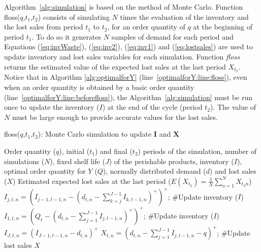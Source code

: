 Algorithm~\ref{alg:simulation} is based on the method of Monte Carlo. Function floss($q$,$t_1$,$t_2$)  consists of simulating $N$ times the evaluation of the inventory and the lost sales from period $t_1$ to $t_2$, for an order quantity of $q$ at the beginning of period $t_1$. To do so it generates $N$ samples of demand for each period and Equations (\ref{eq:invWaste}), (\ref{eq:inv2}), (\ref{eq:inv1}) and (\ref{eq:lostsales}) are used to update inventory and lost sales variables for each simulation. Function \emph{floss} returns the  estimated value of the expected lost sales  at the last period $X_{t_2}$. %
 Notice that in Algorithm \ref{alg:optimalforY} (line~\ref{optimalforY:line:floss}), even when an order quantity is obtained by a basic order quantity (line~\ref{optimalforY:line:beforefloss}), the Algorithm~\ref{alg:simulation} must be run once  to update the inventory ($I$) at the end of the cycle (period $t_2$). The value of $N$ must be large enough to provide accurate values for the lost sales.




\begin{algorithm}[!hbt]
	\caption{floss($q$,$t_1$,$t_2$): Monte Carlo simulation to update $\boldsymbol{I}$ and $\boldsymbol{X}$}
	\label{alg:simulation}
	\begin{algorithmic}[1]
        \REQUIRE Order quantity ($q$), initial ($t_1$) and final ($t_2$) periods of the simulation, number of simulations ($N$), fixed shelf life ($J$) of the perishable products, inventory ($I$), optimal order quantity for $Y$ ($Q$), normally distributed demand ($d$) and lost sales ($X$)
        \ENSURE  Estimated expected lost sales at the last period ($E(X_{t_2})=\frac{1}{N}\sum\limits_{n=1}^{N}X_{t_2n}$)
        \medskip
					\STATE $I_{j,t,n}= \left(I_{j-1,t-1,n} - (d_{t,n}-\sum_{k=j}^{J-1}I_{k,t-1,n})^+\right)^+$; \hfill \#Update inventory ($I$)
				\ENDFOR
				\STATE $I_{1,t,n}= \left(Q_t - (d_{t,n}-\sum_{j=1}^{J-1}I_{j,t-1,n})^+\right)^+$; \hfill \#Update inventory ($I$)
				\STATE $I_{J,t,n}=(I_{J-1,t-1,n} - d_{t,n})^+$
				\STATE $X_{t,n}=\left(d_{t,n}-\sum_{j=1}^{J-1}I_{j,t-1,n}-q\right)^+$; \hfill \#Update lost sales $X$
			\ENDFOR
		\ENDFOR
		\vskip 5pt
	\end{algorithmic}
	
\end{algorithm}


